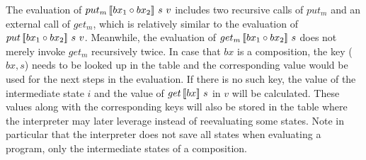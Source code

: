 The evaluation of $put_m \, [\![bx_1 \circ bx_2]\!] \ s \ v$ includes two recursive calls of $put_m$ and an external call of $get_m$, which is relatively similar to the evaluation of $put \, [\![bx_1 \circ bx_2]\!] \ s \ v$. 
Meanwhile, the evaluation of $get_m \, [\![bx_1 \circ bx_2]\!] \ s$ does not merely invoke $get_m$ recursively twice. In case that $bx$ is a composition, the key ($bx,s$) needs to be looked up in the table and the corresponding value would be used for the next steps in the evaluation. If there is no such key, the value of the intermediate state $i$ and the value of $get \, [\![bx]\!] \ s$ in $v$ will be calculated. These values along with the corresponding keys will also be stored in the table where the interpreter may later 
leverage instead of reevaluating some states.
Note in particular 
that the interpreter does not save all states when evaluating a program, only the intermediate states of a composition.
